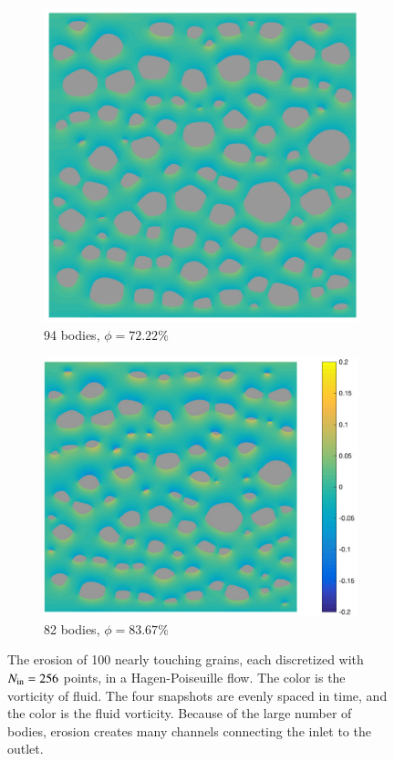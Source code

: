 \documentclass[preprint,10pt]{elsarticle}
\begin{document}
\begin{figure}[H]
\begin{subfigure}[b]{0.5\textwidth}
\includegraphics*[width =0.9\linewidth]{./figs/100b_150}
\caption{94 bodies, $\phi = 72.22\%$}
\end{subfigure}%
\begin{subfigure}[b]{0.5\textwidth}
\includegraphics*[width =1.1\linewidth]{./figs/100b_200}
\caption{82 bodies, $\phi = 83.67\%$}
\end{subfigure}
\caption{\label{fig:Eroding100vort} The erosion of 100 nearly
touching grains, each discretized with $N_{\mathrm{in}} = 256$ points, in a
Hagen-Poiseuille flow. The color is the vorticity of fluid. The four
snapshots are evenly spaced in time, and the color is the fluid
vorticity.  Because of the large number of bodies, erosion creates many
channels connecting the inlet to the outlet.}
\end{figure}
\end{document}
